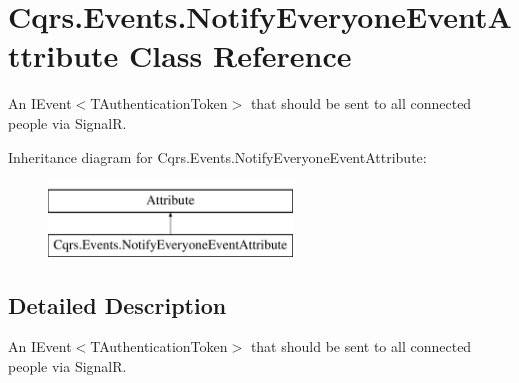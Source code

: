 \hypertarget{classCqrs_1_1Events_1_1NotifyEveryoneEventAttribute}{}\section{Cqrs.\+Events.\+Notify\+Everyone\+Event\+Attribute Class Reference}
\label{classCqrs_1_1Events_1_1NotifyEveryoneEventAttribute}


An I\+Event$<$\+T\+Authentication\+Token$>$ that should be sent to all connected people via SignalR.  


Inheritance diagram for Cqrs.\+Events.\+Notify\+Everyone\+Event\+Attribute\+:\begin{figure}[H]
\begin{center}
\leavevmode
\includegraphics[height=2.000000cm]{classCqrs_1_1Events_1_1NotifyEveryoneEventAttribute}
\end{center}
\end{figure}


\subsection{Detailed Description}
An I\+Event$<$\+T\+Authentication\+Token$>$ that should be sent to all connected people via SignalR. 

